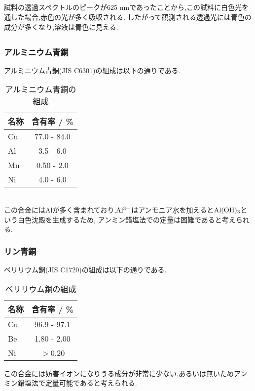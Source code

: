 \subsection{}
試料の透過スペクトルのピークが625 \si{\nano\meter}であったことから,この試料に白色光を通した場合,赤色の光が多く吸収される.
したがって観測される透過光には青色の成分が多くなり,溶液は青色に見える.
\subsection{}
\subsubsection*{アルミニウム青銅}
アルミニウム青銅(JIS C6301)の組成は以下の通りである\cite{kiso}.
\begin{table}[h]
   \caption{アルミニウム青銅の組成}
   \label{tab:alseido}
   \centering
   \begin{tabular}{lc}
     \hline
     名称&含有率 / \%\\
     \hline \hline
     Cu&77.0 - 84.0\\
     Al&3.5 - 6.0\\
     Mn&0.50 - 2.0\\
     Ni&4.0 - 6.0\\
     \hline
   \end{tabular}
\end{table}\\
この合金にはAlが多く含まれており,$\rm Al^{3+}$はアンモニア水を加えると$\rm Al(OH)_3$という白色沈殿を生成するため,
アンミン錯塩法での定量は困難であると考えられる.
\subsubsection*{リン青銅}
ベリリウム銅(JIS C1720)の組成は以下の通りである\cite{kiso}.
\begin{table}[h]
   \caption{ベリリウム銅の組成}
   \label{tab:pseido}
   \centering
   \begin{tabular}{lc}
     \hline
     名称&含有率 / \%\\
     \hline \hline
     Cu&96.9 - 97.1\\
     Be&1.80 - 2.00\\
     Ni&$>$0.20\\
     \hline
   \end{tabular}
\end{table}
この合金には妨害イオンになりうる成分が非常に少ない,あるいは無いためアンミン錯塩法で定量可能であると考えられる.
